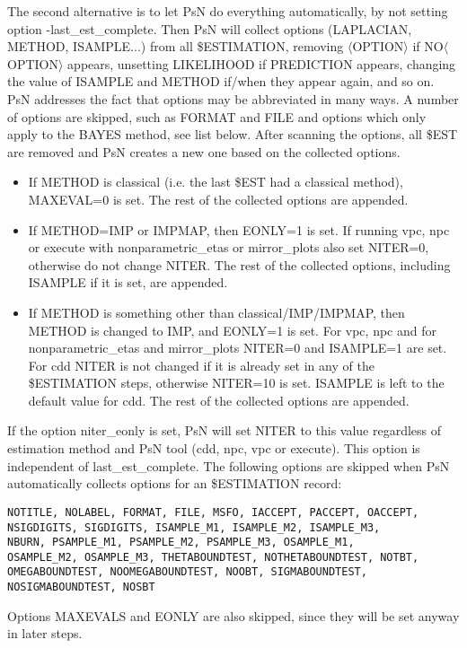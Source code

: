The second alternative is to let PsN do everything automatically, by not setting option -last\_est\_complete. Then PsN will collect options (LAPLACIAN, METHOD, ISAMPLE...) from all \$ESTIMATION, removing $\langle$OPTION$\rangle$ if NO$\langle$OPTION$\rangle$ appears, unsetting LIKELIHOOD if PREDICTION appears, changing the value of ISAMPLE and METHOD if/when they appear again, and so on. PsN addresses the fact that options may be abbreviated in many ways. A number of options are skipped, such as FORMAT and FILE and options which only apply to the BAYES method, see list below. After scanning the options, all \$EST are removed and PsN creates a new one based on the collected options. 

\begin{itemize}
	\item If METHOD is classical (i.e. the last \$EST had a classical method), MAXEVAL=0 is set. The rest of the collected options are appended.
	\item If METHOD=IMP or IMPMAP, then EONLY=1 is set. If running vpc, npc or execute with nonparametric\_etas or mirror\_plots also set NITER=0, otherwise do not change NITER. The rest of the collected options, including ISAMPLE if it is set, are appended. 
	\item If METHOD is something other than classical/IMP/IMPMAP, then METHOD is changed to IMP, and EONLY=1 is set. For vpc, npc and for nonparametric\_etas and mirror\_plots NITER=0 and ISAMPLE=1 are set. For cdd NITER is not changed if it is already set in any of the \$ESTIMATION steps, otherwise NITER=10 is set. ISAMPLE is left to the default value for cdd. The rest of the collected options are appended.
\end{itemize}

If the option niter\_eonly is set, PsN will set NITER to this value regardless of estimation method and PsN tool (cdd, npc, vpc or execute). This option is independent of last\_est\_complete.
The following options are skipped when PsN automatically collects options for an \$ESTIMATION record:
\begin{verbatim}
NOTITLE, NOLABEL, FORMAT, FILE, MSFO, IACCEPT, PACCEPT, OACCEPT,
NSIGDIGITS, SIGDIGITS, ISAMPLE_M1, ISAMPLE_M2, ISAMPLE_M3,
NBURN, PSAMPLE_M1, PSAMPLE_M2, PSAMPLE_M3, OSAMPLE_M1,
OSAMPLE_M2, OSAMPLE_M3, THETABOUNDTEST, NOTHETABOUNDTEST, NOTBT,
OMEGABOUNDTEST, NOOMEGABOUNDTEST, NOOBT, SIGMABOUNDTEST,
NOSIGMABOUNDTEST, NOSBT
\end{verbatim}
Options MAXEVALS and EONLY are also skipped, since they will be set anyway in later steps.

